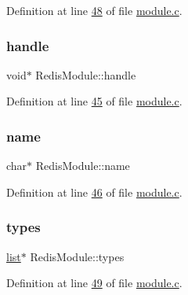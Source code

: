 Definition at line \hyperlink{module_8c_source_l00048}{48} of file \hyperlink{module_8c_source}{module.\+c}.

\mbox{\label{structRedisModule_a9c26377a53062ac55b4fe2883b0be9f5}} 
\subsubsection{\texorpdfstring{handle}{handle}}
{\footnotesize\ttfamily void$\ast$ Redis\+Module\+::handle}



Definition at line \hyperlink{module_8c_source_l00045}{45} of file \hyperlink{module_8c_source}{module.\+c}.

\mbox{\label{structRedisModule_aef4e327d81c55974ee3dc2d797bdcf94}} 
\subsubsection{\texorpdfstring{name}{name}}
{\footnotesize\ttfamily char$\ast$ Redis\+Module\+::name}



Definition at line \hyperlink{module_8c_source_l00046}{46} of file \hyperlink{module_8c_source}{module.\+c}.

\mbox{\label{structRedisModule_a0301e92adcc1aa97a600a8a03d1ad555}} 
\subsubsection{\texorpdfstring{types}{types}}
{\footnotesize\ttfamily \hyperlink{structlist}{list}$\ast$ Redis\+Module\+::types}



Definition at line \hyperlink{module_8c_source_l00049}{49} of file \hyperlink{module_8c_source}{module.\+c}.

\mbox{\label{structRedisModule_a27bdecef862ee93e4d9c2eee7f180394}} 
